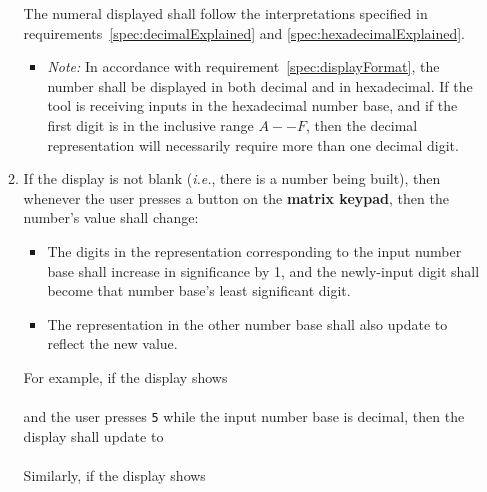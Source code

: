 \begin{enumerate}
\begin{enumerate}
            The numeral displayed shall follow the interpretations specified in requirements~\ref{spec:decimalExplained} and \ref{spec:hexadecimalExplained}.
            \begin{itemize}
                \item \textit{Note:} In accordance with requirement~\ref{spec:displayFormat}, the number shall be displayed in both decimal and in hexadecimal.
                    If the tool is receiving inputs in the hexadecimal number base, and if the first digit is in the inclusive range $A--F$, then the decimal representation will necessarily require more than one decimal digit.
            \end{itemize}
        \item \label{spec:BuildingValue} If the display is not blank (\textit{i.e.}, there is a number being built), then whenever the user presses a button on the \textbf{matrix keypad}, then the number's value shall change:
            \begin{itemize}
                \item The digits in the representation corresponding to the input number base shall increase in significance by 1, and the newly-input digit shall become that number base's least significant digit.
                \item The representation in the other number base shall also update to reflect the new value.
            \end{itemize}
            For example, if the display shows \\
             \\
            and the user presses \texttt{5} while the input number base is decimal, then the display shall update to \\
             \\
            Similarly, if the display shows \\
\end{enumerate}
\end{enumerate}
